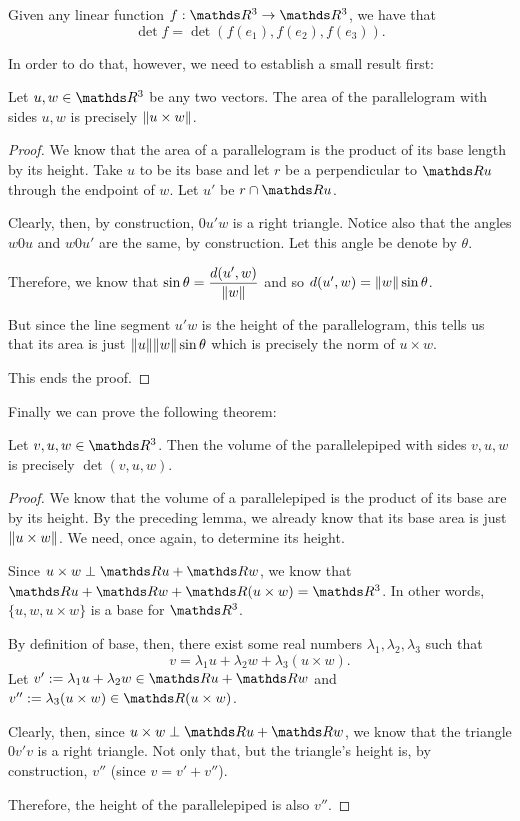 \begin{theorem}
	Given any linear function $f:\R^3\to \R^3$, we have that\[\det f=\det(f(e_1),f(e_2),f(e_3)).\]
\end{theorem}

In order to do that, however, we need to establish a small result first:

\begin{lemma}
	Let $u,w\in \R^3$ be any two vectors. The area of the parallelogram with sides $u,w$ is precisely $\lVert u\times w\rVert$.
\end{lemma}
\begin{proof}
	We know that the area of a parallelogram is the product of its base length by its height. Take $u$ to be its base and let $r$ be a perpendicular to $\R u$ through the endpoint of $w$. Let $u'$ be $r\cap \R u$.
	
	Clearly, then, by construction, $0u'w$ is a right triangle. Notice also that the angles $w0u$ and $w0u'$ are the same, by construction. Let this angle be denote by $\theta$.
	
	Therefore, we know that $\sin\theta = \dfrac{d(u',w)}{\lVert w\rVert}$ and so $d(u',w)=\lVert w\rVert\sin\theta$.
	
	But since the line segment $u'w$ is the height of the parallelogram, this tells us that its area is just $\lVert u\rVert\lVert w\rVert\sin\theta$ which is precisely the norm of $u\times w$.
	
	This ends the proof.
\end{proof}

Finally we can prove the following theorem:

\begin{theorem}
	Let $v,u,w\in \R^3$. Then the volume of the parallelepiped with sides $v,u,w$ is precisely $\det(v,u,w)$.
\end{theorem}
\begin{proof}
	We know that the volume of a parallelepiped is the product of its base are by its height. By the preceding lemma, we already know that its base area is just $\lVert u\times w\rVert$. We need, once again, to determine its height.
	
	Since $u\times w\perp \R u+\R w$, we know that $\R u+\R w+\R(u\times w)=\R^3$. In other words, $\{u,w,u\times w\}$ is a base for $\R^3$.
	
	By definition of base, then, there exist some real numbers $\lambda_1,\lambda_2,\lambda_3$ such that $$v=\lambda_1u+\lambda_2w+\lambda_3(u\times w).$$Let $v':=\lambda_1u+\lambda_2w\in \R u+\R w$ and $v'':=\lambda_3(u\times w)\in \R(u\times w)$.
	
	Clearly, then, since $u\times w\perp \R u+\R w$, we know that the triangle $0v'v$ is a right triangle. Not only that, but the triangle's height is, by construction, $v''$ (since $v=v'+v''$).
	
	Therefore, the height of the parallelepiped is also $v''$.
\end{proof}